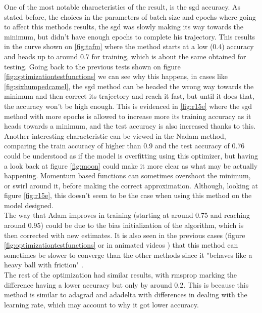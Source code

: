 \documentclass{article}
\begin{document}
One of the most notable characteristics of the result, is the sgd accuracy. As stated before, the choices in the parameters of batch size and epochs where going to affect this methods results, the sgd was slowly making its way towards the minimum, but didn't have enough epochs to complete his trajectory. This results in the curve shown on \ref{fig:tafm} where the method starts at a low (0.4) accuracy and heads up to around 0.7 for training, which is about the same obtained for testing. Going back to the previous tests shown on figure \ref{fig:optimizationtestfunctions} we can see why this happens, in cases like \ref{fig:sixhumpedcamel}, the sgd method can be headed the wrong way towards the minimum and then correct its trajectory and reach it fast, but until it does that, the accuracy won't be high enough. This is evidenced in \ref{fig:r15e} where the sgd method with more epochs is allowed to increase more its training accuracy as it heads towards a minimum, and the test accuracy is also increased thanks to this. \\
Another interesting characteristic can be viewed in the Nadam method, comparing the train accuracy of higher than 0.9 and the test accuracy of 0.76 could be understood as if the model is overfitting using this optimizer, but having a look back at figure \ref{fig:moon} could make it more clear as what may be actually happening. Momentum based functions can sometimes overshoot the minimum, or swirl around it, before making the correct approximation. Although, looking at figure \ref{fig:r15e}, this doesn't seem to be the case when using this method on the model designed. \\
The way that Adam improves in training (starting at around 0.75 and reaching around 0.95) could be due to the bias initialization of the algorithm, which is then corrected with new estimates. It is also seen in the previous cases (figure \ref{fig:optimizationtestfunctions} or in animated videos \cite{clark_2017}) that this method can sometimes be slower to converge than the other methods since it "behaves like a heavy ball with friction" \cite{Ruder16}.\\
The rest of the optimization had similar results, with rmsprop marking the difference having a lower accuracy but only by around 0.2. This is because this method is similar to adagrad and adadelta with differences in dealing with the learning rate, which may account to why it got lower accuracy.
\end{document}
